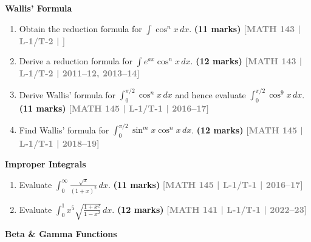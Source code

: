 \documentclass[12pt,a4paper]{article}
\newcommand{\yr}[1]{\hfill\textcolor{gray}{\small\textbf{[#1]}}}
\newcommand{\mk}[1]{\textcolor{orange!70!black}{\small\textbf{(#1 marks)}}}
\newcommand{\subtopic}[2]{%
  \vspace{10pt}
  \noindent\begin{tcolorbox}[colback=#1!8,colframe=#1,boxrule=0.6pt,arc=4pt,
    left=6pt,right=6pt,top=4pt,bottom=4pt]
    \small\bfseries\textcolor{#1}{#2}
  \end{tcolorbox}
  \vspace{2pt}
}
\begin{document}
\subtopic{cB}{Wallis' Formula}
\label{sub:s2-wallis}

\begin{enumerate}

\item Obtain the reduction formula for $\displaystyle\int \cos^{n}x\,dx$.
\mk{11} \yr{MATH 143 | L-1/T-2 | }

\item Derive a reduction formula for $\displaystyle\int e^{ax}\cos^{n}x\,dx$.
\mk{12} \yr{MATH 143 | L-1/T-2 | 2011--12, 2013--14}

\item Derive Wallis' formula for $\displaystyle\int_{0}^{\pi/2}\cos^{n}x\,dx$ and hence evaluate $\displaystyle\int_{0}^{\pi/2}\cos^{9}x\,dx$.
\mk{11} \yr{MATH 145 | L-1/T-1 | 2016--17}

\item Find Wallis' formula for $\displaystyle\int_{0}^{\pi/2}\sin^{m}x\cos^{n}x\,dx$.
\mk{12} \yr{MATH 145 | L-1/T-1 | 2018--19}

\end{enumerate}

\subtopic{cB}{Improper Integrals}
\label{sub:s2-improper}

\begin{enumerate}

\item Evaluate $\displaystyle\int_{0}^{\infty}\frac{\sqrt{x}}{(1+x)^{2}}\,dx$.
\mk{11} \yr{MATH 145 | L-1/T-1 | 2016--17}

\item Evaluate $\displaystyle\int_{0}^{1}x^{5}\sqrt{\frac{1+x^{2}}{1-x^{2}}}\,dx$.
\mk{12} \yr{MATH 141 | L-1/T-1 | 2022--23}

\end{enumerate}

\subtopic{cB}{Beta \& Gamma Functions}
\label{sub:s2-beta}
\end{document}
